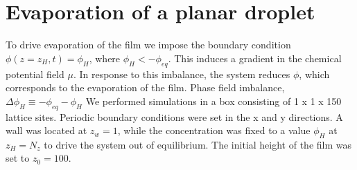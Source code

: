 \documentclass{article}
\begin{document}
\section{Evaporation of a planar droplet}

To drive evaporation of the film we impose the boundary condition $\phi(z=z_{H},t)=\phi_{H}$, where $\phi_{H} < -\phi_{eq}$. This induces a gradient in the chemical potential field $\mu$. In response to this imbalance, the system reduces $\phi$, which corresponds to the evaporation of the film\cite{paper:evaporation}.
Phase field imbalance, $\Delta\phi_{H} \equiv -\phi_{eq} - \phi_{H}$
\newline
We performed simulations in a box consisting of  1 x 1 x 150 lattice sites. Periodic boundary conditions were set in the x and
y directions. A wall was located at $ z_{w} = 1 $, while the concentration
was fixed to a value $ \phi_{H}$ at $z_{H} = N_{z} $ to drive the system out of equilibrium. The initial height of the film was set to $z_{0} = 100$. 
\end{document}
